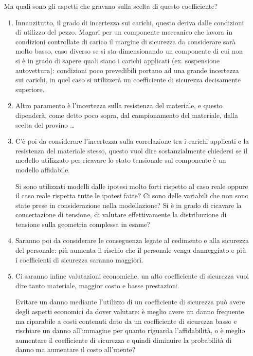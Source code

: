 \documentclass{article}
\begin{document}
\begin{adjustwidth}{2in}{}
	    Ma quali sono gli aspetti che gravano sulla scelta di questo coefficiente?
	    \begin{enumerate}
	    	\item Innanzitutto, il grado di incertezza sui carichi, questo deriva dalle condizioni di utilizzo del pezzo. Magari per un componente meccanico che lavora in condizioni controllate di carico il margine di sicurezza da considerare sarà molto basso, caso diverso se si sta dimensionando un componente di cui non si è in grado di sapere quali siano i carichi applicati (ex. sospensione autovettura): condizioni poco prevedibili portano ad una grande incertezza sui carichi, in quel caso si utilizzerà un coefficiente di sicurezza decisamente superiore. 
	    	
	    	\item Altro paramento è l'incertezza sulla resistenza del materiale, e questo dipenderà, come detto poco sopra, dal campionamento del materiale, dalla scelta del provino \dots
	    	
	    	\item C'è poi da considerare l'incertezza sulla correlazione tra i carichi applicati e la resistenza del materiale stesso, questo vuol dire sostanzialmente chiedersi se il modello utilizzato per ricavare lo stato tensionale sul componente è un modello affidabile. 
	    	
	    	Si sono utilizzati modelli dalle ipotesi molto forti rispetto al caso reale oppure il caso reale rispetta tutte le ipotesi fatte? Ci sono delle variabili che non sono state prese in considerazione nella modellazione? Si è in grado di ricavare la concertazione di tensione, di valutare effettivamente la distribuzione di tensione sulla geometria complessa in esame? 
	    	
	    	\item Saranno poi da considerare le conseguenza legate al cedimento e alla sicurezza del personale: più aumenta il rischio che il personale venga danneggiato e più i coefficienti di sicurezza saranno maggiori.
	    	
	    	\item Ci saranno infine valutazioni economiche, un alto coefficiente di sicurezza vuol dire tanto materiale, maggior costo e basse prestazioni. 
	    	
	    	Evitare un danno mediante l'utilizzo di un coefficiente di sicurezza può avere degli aspetti economici da dover valutare: è meglio avere un danno frequente ma riparabile a costi contenuti dato da un coefficiente di sicurezza basso e rischiare un danno all'immagine per quanto riguarda l'affidabilità, o è meglio aumentare il coefficiente di sicurezza e quindi diminuire la probabilità di danno ma aumentare il costo all'utente? 
	    	

\end{enumerate}
\end{adjustwidth}
\end{document}
